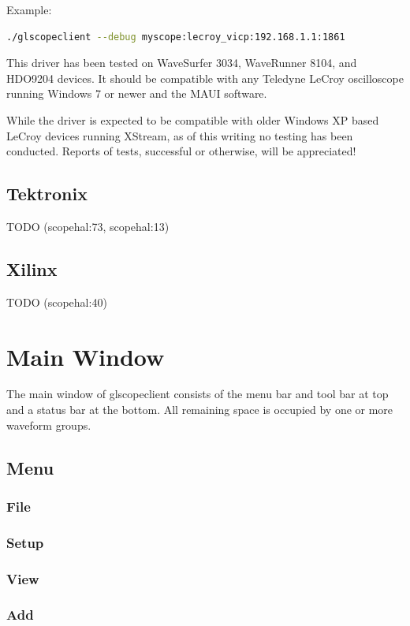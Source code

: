 \documentclass[11pt]{article}
\begin{document}
Example:
\begin{lstlisting}[language=sh]
./glscopeclient --debug myscope:lecroy_vicp:192.168.1.1:1861
\end{lstlisting}

This driver has been tested on WaveSurfer 3034, WaveRunner 8104, and HDO9204 devices. It should be compatible with any
Teledyne LeCroy oscilloscope running Windows 7 or newer and the MAUI software.

While the driver is expected to be compatible with older Windows XP based LeCroy devices running XStream, as of this
writing no testing has been conducted. Reports of tests, successful or otherwise, will be appreciated!

\subsection{Tektronix}
TODO (scopehal:73, scopehal:13)

\subsection{Xilinx}
TODO (scopehal:40)

\pagebreak
\section{Main Window}

The main window of glscopeclient consists of the menu bar and tool bar at top and a status bar at the bottom. All
remaining space is occupied by one or more waveform groups.

\subsection{Menu}

\subsubsection{File}

\subsubsection{Setup}

\subsubsection{View}

\subsubsection{Add}
\end{document}

